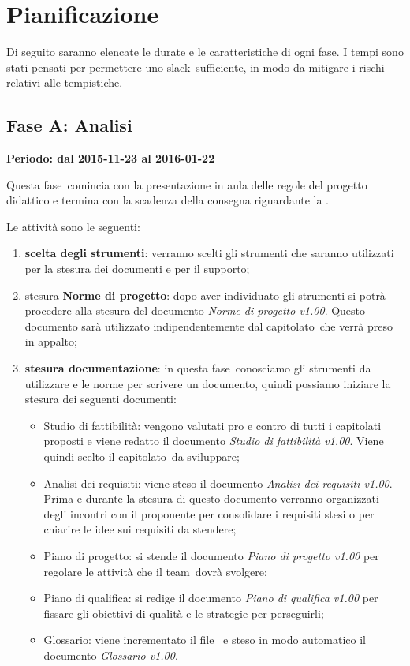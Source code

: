 \documentclass[../PianoProgetto.tex]{subfiles}
\begin{document}
\section{Pianificazione}

	Di seguito saranno elencate le durate e le caratteristiche di ogni fase\g . I tempi sono stati pensati per permettere uno slack\g\ sufficiente, in modo da mitigare i rischi relativi alle tempistiche.
	
	\subsection{Fase A: Analisi}
	
	\textbf{Periodo: dal 2015-11-23 al 2016-01-22}

	Questa fase\g\ comincia con la presentazione in aula delle regole del progetto didattico e termina con la scadenza della consegna riguardante la \revisionedeirequisiti .

	Le attività sono le seguenti:
	\begin{enumerate}
		\item \textbf{scelta degli strumenti}: verranno scelti gli strumenti che saranno utilizzati per la stesura dei documenti e per il supporto;
		\item stesura \textbf{Norme di progetto}: dopo aver individuato gli strumenti si potrà procedere alla stesura del documento \textit{Norme di progetto v1.00}. Questo documento sarà utilizzato indipendentemente dal capitolato\g\ che verrà preso in appalto;
		\item \textbf{stesura documentazione}: in questa fase\g\ conosciamo gli strumenti da utilizzare e le norme per scrivere un documento, quindi possiamo iniziare la stesura dei seguenti documenti:
		\begin{itemize}
		\item Studio di fattibilità: vengono valutati pro e contro di tutti i capitolati proposti e viene redatto il documento \textit{Studio di fattibilità v1.00}. Viene quindi scelto il capitolato\g\ da sviluppare;
		\item Analisi dei requisiti: viene steso il documento \textit{Analisi dei requisiti v1.00}. Prima e durante la stesura di questo documento verranno organizzati degli incontri con il proponente per consolidare i requisiti stesi o per chiarire le idee sui requisiti da stendere;
		\item Piano di progetto: si stende il documento \textit{Piano di progetto v1.00} per regolare le attività che il team\g\ dovrà svolgere;
		\item Piano di qualifica: si redige il documento \textit{Piano di qualifica v1.00} per fissare gli obiettivi di qualità e le strategie per perseguirli;
		\item Glossario: viene incrementato il file \glossario\ e steso in modo automatico il documento \textit{Glossario v1.00}.
		\end{itemize}
	\end{enumerate}
		
\end{document}
